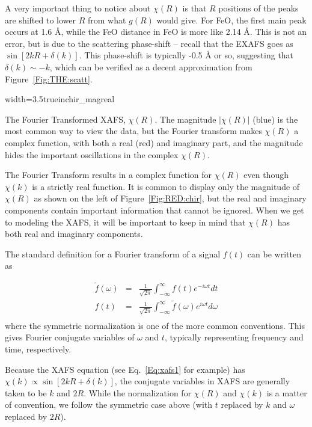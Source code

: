 A very important thing to notice about $\chi(R)$ is that $R$ positions of
the peaks are shifted to lower $R$ from what $g(R)$ would give.  For FeO,
the first main peak occurs at 1.6 {\AA}, while the FeO distance in FeO is
more like 2.14 {\AA}. This is not an error, but is due to the scattering
phase-shift -- recall that the EXAFS goes as $\sin{[2kR +
  \delta(k)]}$. This phase-shift is typically -0.5 {\AA} or so, suggesting
that $\delta(k) \sim -k$, which can be verified as a decent approximation
from Figure~\ref{Fig:THE:scatt}.

\begin{Nfig}{width=3.5truein}{chir_magreal}
  \caption{The Fourier Transformed XAFS, $\chi(R)$. The magnitude
    $|\chi(R)|$ (blue) is the most common way to view the data, but the
    Fourier transform makes $\chi(R)$ a complex function, with both a real
    (red) and imaginary part, and the magnitude hides the important
    oscillations in the complex $\chi(R)$.}
  \label{Fig:RED:chir}
\end{Nfig}

The Fourier Transform results in a complex function for $\chi(R)$ even
though $\chi(k)$ is a strictly real function.  It is common to display only
the magnitude of $\chi(R)$ as shown on the left of Figure~\ref{Fig:RED:chir},
but the real and imaginary components contain important information that
cannot be ignored.  When we get to modeling the XAFS, it will be important
to keep in mind that $\chi(R)$ has both real and imaginary components.

The standard definition for a Fourier transform of a signal $f(t)$ can be written as

\begin{eqnarray}
  {\tilde{f}}(\omega) &=& \frac{1}{\sqrt{2\pi}} \int_{-\infty}^{\infty}
  f(t) e^{-i{\omega}t} dt \\
  f(t) &=& \frac{1}{\sqrt{2\pi}} \int_{-\infty}^{\infty}
  {\tilde{f}}(\omega) e^{i{\omega}t} d{\omega} \\
\end{eqnarray}
\noindent
where the symmetric normalization is one of the more common conventions.
This gives Fourier conjugate variables of $\omega$ and $t$, typically
representing frequency and time, respectively.

Because the XAFS equation (see Eq.~\ref{Eq:xafs1} for example) has $\chi(k)
\propto \sin[2kR + \delta(k)] $, the conjugate variables in XAFS are
generally taken to be $k$ and $2R$.  While the normalization for $\chi(R)$
and $\chi(k)$ is a matter of convention, we follow the symmetric case above
(with $t$ replaced by $k$ and $\omega$ replaced by $2R$).


